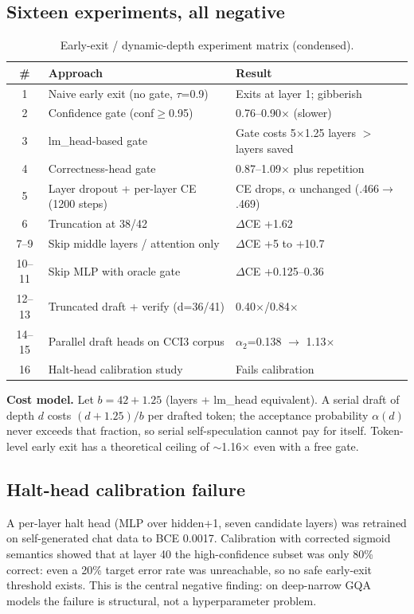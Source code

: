 \documentclass[11pt,a4paper]{article}
\begin{document}
\subsection{Sixteen experiments, all negative}
\begin{table}[h]
\centering
\small
\begin{tabular}{cll}
\toprule
\# & Approach & Result\\
\midrule
1 & Naive early exit (no gate, $\tau$=0.9) & Exits at layer 1; gibberish\\
2 & Confidence gate (conf$\geq$0.95) & 0.76--0.90$\times$ (slower)\\
3 & lm\_head-based gate & Gate costs 5$\times$1.25 layers $>$ layers saved\\
4 & Correctness-head gate & 0.87--1.09$\times$ plus repetition\\
5 & Layer dropout + per-layer CE (1200 steps) & CE drops, $\alpha$ unchanged (.466$\to$.469)\\
6 & Truncation at 38/42 & $\Delta$CE +1.62\\
7--9 & Skip middle layers / attention only & $\Delta$CE +5 to +10.7\\
10--11 & Skip MLP with oracle gate & $\Delta$CE +0.125--0.36\\
12--13 & Truncated draft + verify (d=36/41) & 0.40$\times$/0.84$\times$\\
14--15 & Parallel draft heads on CCI3 corpus & $\alpha_2$=0.138 $\to$ 1.13$\times$\\
16 & Halt-head calibration study & Fails calibration\\
\bottomrule
\end{tabular}
\caption{Early-exit / dynamic-depth experiment matrix (condensed).}
\end{table}
\noindent\textbf{Cost model.} Let $b=42+1.25$ (layers + lm\_head equivalent). A serial draft of
depth $d$ costs $(d+1.25)/b$ per drafted token; the acceptance probability $\alpha(d)$ never
exceeds that fraction, so serial self-speculation cannot pay for itself. Token-level early
exit has a theoretical ceiling of $\sim$1.16$\times$ even with a free gate.

\subsection{Halt-head calibration failure}
A per-layer halt head (MLP over hidden+1, seven candidate layers) was retrained on
self-generated chat data to BCE 0.0017. Calibration with corrected sigmoid semantics showed
that at layer 40 the high-confidence subset was only 80\% correct: even a 20\% target error
rate was unreachable, so no safe early-exit threshold exists. This is the central negative
finding: on deep-narrow GQA models the failure is structural, not a hyperparameter problem.
\end{document}
